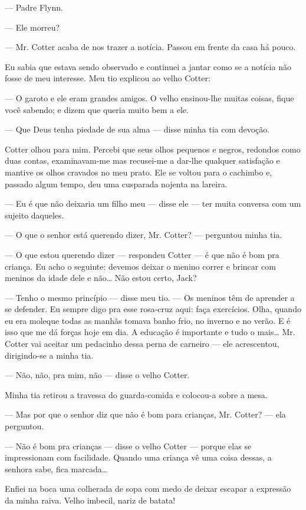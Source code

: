 --- Padre Flynn.

--- Ele morreu?

--- Mr. Cotter acaba de nos trazer a notícia. Passou em frente da casa
há pouco.

Eu sabia que estava sendo observado e continuei a jantar como se a
notícia não fosse de meu interesse. Meu tio explicou ao velho
Cotter:

--- O garoto e ele eram grandes amigos. O velho ensinou-lhe muitas
coisas, fique você sabendo; e dizem que queria muito bem a ele.

--- Que Deus tenha piedade de sua alma --- disse minha tia com devoção.

Cotter olhou para mim. Percebi que seus olhos pequenos e negros,
redondos como duas contas, examinavam-me mas recusei-me a dar-lhe
qualquer satisfação e mantive os olhos cravados no meu prato. Ele se
voltou para o cachimbo e, passado algum tempo, deu uma cusparada
nojenta na lareira.

--- Eu é que não deixaria um filho meu --- disse ele --- ter muita
conversa com um sujeito daqueles.

--- O que o senhor está querendo dizer, Mr. Cotter? --- perguntou
minha tia.

--- O que estou querendo dizer --- respondeu Cotter --- é que não é
bom pra criança. Eu acho o seguinte: devemos deixar o
menino correr e brincar com meninos da idade dele e não\ldots{} Não estou
certo, Jack?

--- Tenho o mesmo princípio --- disse meu tio. --- Os meninos têm de
aprender a se defender. Eu sempre digo pra esse rosa-cruz aqui: faça
exercícios. Olha, quando eu era moleque todas as manhãs tomava banho
frio, no inverno e no verão. E é isso que me dá forças hoje em dia. A
educação é importante e tudo o mais\ldots{} Mr. Cotter vai aceitar um
pedacinho dessa perna de carneiro --- ele acrescentou, dirigindo-se a
minha tia.

--- Não, não, pra mim, não --- disse o velho Cotter.

Minha tia retirou a travessa do guarda-comida e colocou-a sobre
a mesa.

--- Mas por que o senhor diz que não é bom para crianças, Mr. Cotter?
--- ela perguntou.

--- Não é bom pra crianças --- disse o velho Cotter --- porque elas se
impressionam com facilidade. Quando uma criança vê uma coisa dessas, a
senhora sabe, fica marcada\ldots{}

Enfiei na boca uma colherada de sopa com medo de deixar escapar a
expressão da minha raiva. Velho imbecil, nariz de batata!

